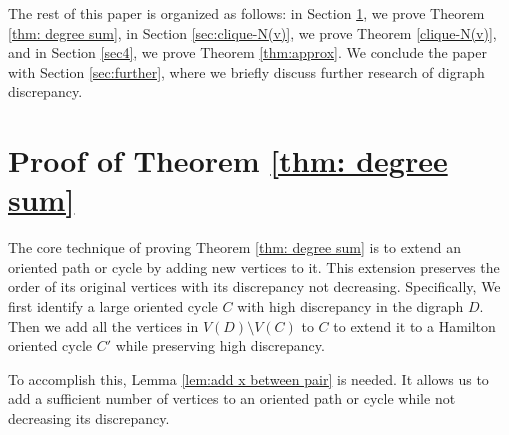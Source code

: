 \documentclass[11pt]{article}
\newtheorem{theorem}{Theorem}[section]
\newcommand{\GGr}[1]{{#1}}
\newcommand{\QGr}[1]{{#1}}
\newcommand{\QG}[1]{{#1}}
\newcommand{\2}{\vspace{0.2cm}}
\begin{document}
	
The rest of this paper is organized as follows: in Section \ref{sec2}, we prove Theorem \ref{thm: degree sum}, in Section \ref{sec:clique-N(v)}, we prove Theorem \ref{clique-N(v)}, and in Section \ref{sec4}, we prove Theorem \ref{thm:approx}. 
\GGr{We conclude the paper with Section \ref{sec:further}, where we briefly discuss further research of digraph discrepancy.} 
	












\section{Proof of Theorem \ref{thm: degree sum}}\label{sec2}
\QGr{The core technique of proving Theorem \ref{thm: degree sum} is to extend an oriented path or cycle by adding new vertices to it. This extension preserves the order of its original vertices with its discrepancy not decreasing. Specifically, We first identify a large oriented cycle $C$ with high discrepancy in the digraph $D$. Then we add all the vertices in $V(D) \setminus V(C)$ to $C$ to extend it to a Hamilton oriented cycle $C'$ while preserving high discrepancy. 

To accomplish this, Lemma \ref{lem:add x between pair} is needed. It allows us to add a sufficient number of vertices to an oriented path or cycle while not decreasing its discrepancy.}
\end{document}
